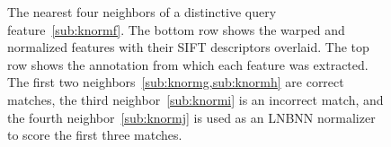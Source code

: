 {\begin{figure}[ht!]
\caption[LNBNN feature correspondence scoring]{
 The nearest four neighbors of a distinctive query feature~\cref{sub:knormf}. The bottom row shows
the warped and normalized features with their SIFT descriptors overlaid. The top row shows the annotation from
which each feature was extracted. The first two neighbors~\cref{sub:knormg,sub:knormh} are correct matches, the
third neighbor~\cref{sub:knormi} is an incorrect match, and the fourth neighbor~\cref{sub:knormj} is used as an
LNBNN normalizer to score the first three matches.
}
\label{fig:knorm}
\end{figure}
}



\begin{comment}
python -m ibeis.algo.hots.chip_match --test-show_single_namematch --qaid 1 \
    --noshow_truth --show_timedelta=False --show_aid=False \
    --dpath ~/latex/crall-thesis-2017 --save figures3/namematch.jpg --diskshow --dpi=300 --figsize=5,5
#
python -m ibeis.algo.hots.chip_match --test-show_single_namematch --qaid 2 --dpath ~/latex/crall-candidacy-2015 --save figures3/namematch.jpg --diskshow --dpi=180 --clipwhite
python -m ibeis.algo.hots.chip_match --test-show_single_namematch --qaid 3 --dpath ~/latex/crall-candidacy-2015 --save figures3/namematch.jpg --diskshow --dpi=180 --clipwhite
python -m ibeis.algo.hots.chip_match --test-show_single_namematch --qaid 4 --dpath ~/latex/crall-candidacy-2015 --save figures3/namematch.jpg --diskshow --dpi=180 --clipwhite
--verbose 
\end{comment}
\newcommand{\namematch}{
\begin{figure}[ht!]
\centering\texttt{[image: figures3/namematch.jpg]}
\caption[\caplbl{namematch}\Nsumprefix{} \namescoring{}]{
\Nsumprefix{} \namescoring{}.
The query annotation is at the top left.
Each query feature matches at most one feature in the exemplars for a name.
Each line denotes a feature correspondence colored by its matching score.
In the top right of each database annotation is its annotation score.
Feature scores from multiple views are combined into a name score shown on top.
}
\label{fig:namematch}
\end{figure}
}


